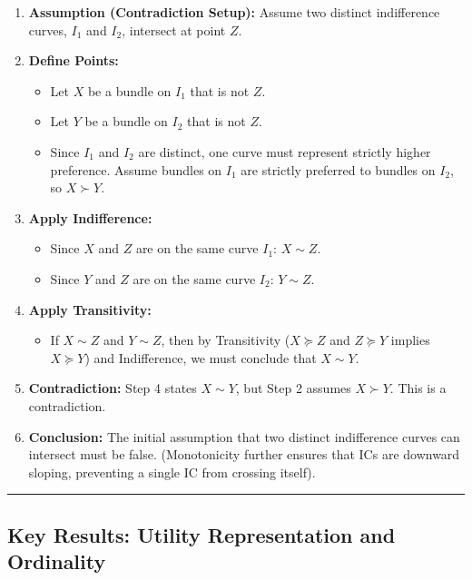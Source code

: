 \documentclass{article}
\begin{document}
\begin{enumerate}
    \item \textbf{Assumption (Contradiction Setup):} Assume two distinct indifference curves, $I_1$ and $I_2$, intersect at point $Z$.

    \item \textbf{Define Points:}
    \begin{itemize}
        \item Let $X$ be a bundle on $I_1$ that is not $Z$.
        \item Let $Y$ be a bundle on $I_2$ that is not $Z$.
        \item Since $I_1$ and $I_2$ are distinct, one curve must represent strictly higher preference. Assume bundles on $I_1$ are strictly preferred to bundles on $I_2$, so $X \succ Y$.
    \end{itemize}

    \item \textbf{Apply Indifference:}
    \begin{itemize}
        \item Since $X$ and $Z$ are on the same curve $I_1$: $X \sim Z$.
        \item Since $Y$ and $Z$ are on the same curve $I_2$: $Y \sim Z$.
    \end{itemize}

    \item \textbf{Apply Transitivity:}
    \begin{itemize}
        \item If $X \sim Z$ and $Y \sim Z$, then by Transitivity ($X \succeq Z$ and $Z \succeq Y$ implies $X \succeq Y$) and Indifference, we must conclude that $X \sim Y$.
    \end{itemize}

    \item \textbf{Contradiction:} Step 4 states $X \sim Y$, but Step 2 assumes $X \succ Y$. This is a contradiction.

    \item \textbf{Conclusion:} The initial assumption that two distinct indifference curves can intersect must be false. (Monotonicity further ensures that ICs are downward sloping, preventing a single IC from crossing itself).
\end{enumerate}

\hrule

\subsection*{Key Results: Utility Representation and Ordinality}
\end{document}
